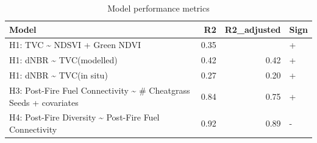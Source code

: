 \documentclass[
  12pt,
]{article}
\begin{document}
\begin{table}

\caption{\label{tab:unnamed-chunk-2}Model performance metrics}
\centering
\fontsize{8}{10}\selectfont
\begin{tabular}[t]{lrrl}
\toprule
Model & R2 & R2\_adjusted & Sign\\
\midrule
H1: TVC \textasciitilde{} NDSVI + Green NDVI & 0.35 &  & +\\
H1: dNBR \textasciitilde{} TVC(modelled) & 0.42 & 0.42 & +\\
H1: dNBR \textasciitilde{} TVC(in situ) & 0.27 & 0.20 & +\\
H3: Post-Fire Fuel Connectivity \textasciitilde{} \# Cheatgrass Seeds + covariates & 0.84 & 0.75 & +\\
H4: Post-Fire Diversity \textasciitilde{} Post-Fire Fuel Connectivity & 0.92 & 0.89 & -\\
\bottomrule
\end{tabular}
\end{table}

\newpage
\end{document}

